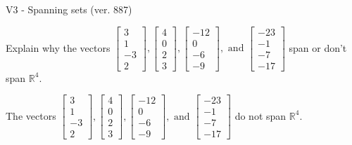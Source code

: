 \begin{exercise}
  \begin{exerciseTitle}V3 - Spanning sets (ver. 887)\end{exerciseTitle}
  \begin{exerciseStatement}
    Explain why the vectors \(\left[\begin{array}{r}
3 \\
1 \\
-3 \\
2
\end{array}\right] , \left[\begin{array}{r}
4 \\
0 \\
2 \\
3
\end{array}\right] , \left[\begin{array}{r}
-12 \\
0 \\
-6 \\
-9
\end{array}\right] , \text{ and } \left[\begin{array}{r}
-23 \\
-1 \\
-7 \\
-17
\end{array}\right]\) span or don't span \(\mathbb{R}^4\). 
	


  \end{exerciseStatement}
  \begin{exerciseAnswer}
   The vectors \(\left[\begin{array}{r}
3 \\
1 \\
-3 \\
2
\end{array}\right] , \left[\begin{array}{r}
4 \\
0 \\
2 \\
3
\end{array}\right] , \left[\begin{array}{r}
-12 \\
0 \\
-6 \\
-9
\end{array}\right] , \text{ and } \left[\begin{array}{r}
-23 \\
-1 \\
-7 \\
-17
\end{array}\right]\) 
  	 do not  
	span \(\mathbb{R}^4\).
  


  \end{exerciseAnswer}
\end{exercise}
